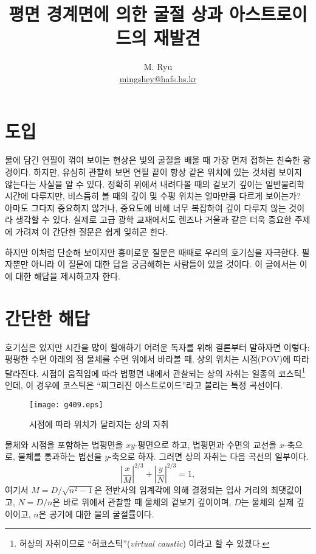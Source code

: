 \documentclass[twocolumn]{article}
\title{평면 경계면에 의한 굴절 상과 아스트로이드의 재발견}
\author{M. Ryu \\ {\href{mailto:mingshey@hafs.hs.kr}{mingshey@hafs.hs.kr}}}
\begin{document}
\maketitle
\section{도입}
물에 담긴 연필이 꺾여 보이는 현상은 빛의 굴절을 배울 때 가장 먼저 접하는 친숙한 광경이다. 
하지만, 유심히 관찰해 보면 연필 끝이 항상 같은 위치에 있는 것처럼 보이지 않는다는 사실을 
알 수 있다. 정확히 위에서 내려다볼 때의 겉보기 깊이는 일반물리학 시간에 다루지만, 비스듬히 볼 
때의 깊이 및 수평 위치는 얼마만큼 다르게 보이는가? 아마도 그다지 중요하지 않거나, 중요도에
비해 너무 복잡하여 깊이 다루지 않는 것이라 생각할 수 있다. 실제로 고급 광학 교재에서도 
렌즈나 거울과 같은 더욱 중요한 주제에 가려져 이 간단한 질문은 쉽게 잊히곤 한다.

하지만 이처럼 단순해 보이지만 흥미로운 질문은 때때로 우리의 호기심을 자극한다. 필자뿐만 
아니라 이 질문에 대한 답을 궁금해하는 사람들이 있을 것이다. 이 글에서는 이에 대한 해답을 
제시하고자 한다.

\section{간단한 해답}

호기심은 있지만 시간을 많이 할애하기 어려운 독자를 위해 결론부터 말하자면 이렇다:  
평평한 수면 아래의 점 물체를 수면 위에서 바라볼 때, 상의 위치는 시점(POV)에 따라 달라진다. 
시점이 움직임에 따라 법평면 내에서 관찰되는 상의 자취는 일종의  코스틱\footnote{허상의 
자취이므로 ``허코스틱''(\emph{virtual caustic}) 이라고 할 수 있겠다.}인데, 이 경우에 
코스틱은 ``찌그러진 아스트로이드''라고 불리는 특정 곡선이다.
	
\begin{figure}[h]
	\centering
	\texttt{[image: g409.eps]} \hfill\null
	\caption{시점에 따라 위치가 달라지는 상의 자취}
	\label{fig:caustic}
\end{figure}

물체와 시점을 포함하는 법평면을 $xy$-평면으로 하고, 법평면과 수면의 교선을 $x$-축으로, 
물체를 통과하는 법선을 $y$-축으로 하자. 그러면 상의 자취는 다음 곡선의 일부이다.
	$$ \left| \dfrac{x}{M} \right| ^ {2/3} 
	+ \left| \dfrac{y}{N} \right| ^ {2/3} = 1,$$
여기서 $M = D/\sqrt{n^2 - 1}$은 전반사의 임계각에 의해 결정되는 입사 거리의 최댓값이고, 
$N = D/n$은 바로 위에서 관찰할 때 물체의 겉보기 깊이이며, 
$D$는 물체의 실제 깊이이고, $n$은 공기에 대한 물의 굴절률이다.
	
\end{document}
